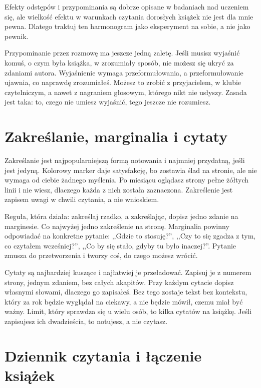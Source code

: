 Efekty odstępów i przypominania są dobrze opisane w badaniach nad uczeniem się, ale wielkość efektu w warunkach czytania dorosłych książek nie jest dla mnie pewna.  Dlatego traktuj ten harmonogram jako eksperyment na sobie, a nie jako pewnik.

Przypominanie przez rozmowę ma jeszcze jedną zaletę. Jeśli musisz wyjaśnić komuś, o czym była książka, w zrozumiały sposób, nie możesz się ukryć za zdaniami autora. Wyjaśnienie wymaga przeformułowania, a przeformułowanie ujawnia, co naprawdę zrozumiałeś. Możesz to zrobić z przyjacielem, w klubie czytelniczym, a nawet z nagraniem głosowym, którego nikt nie usłyszy. Zasada jest taka: to, czego nie umiesz wyjaśnić, tego jeszcze nie rozumiesz.

\section{Zakreślanie, marginalia i cytaty}

Zakreślanie jest najpopularniejszą formą notowania i najmniej przydatną, jeśli jest jedyną. Kolorowy marker daje satysfakcję, bo zostawia ślad na stronie, ale nie wymaga od ciebie żadnego myślenia. Po miesiącu oglądasz strony pełne żółtych linii i nie wiesz, dlaczego każda z nich została zaznaczona. Zakreślenie jest zapisem uwagi w chwili czytania, a nie wnioskiem.

Reguła, która działa: zakreślaj rzadko, a zakreślając, dopisz jedno zdanie na marginesie. Co najwyżej jedno zakreślenie na stronę. Marginalia powinny odpowiadać na konkretne pytanie: ,,Gdzie to stosuję?'', ,,Czy to się zgadza z tym, co czytałem wcześniej?'', ,,Co by się stało, gdyby tu było inaczej?''. Pytanie zmusza do przetworzenia i tworzy coś, do czego możesz wrócić.

Cytaty są najbardziej kuszące i najłatwiej je przeładować. Zapisuj je z numerem strony, jednym zdaniem, bez całych akapitów. Przy każdym cytacie dopisz własnymi słowami, dlaczego go zapisałeś. Bez tego zostaje tekst bez kontekstu, który za rok będzie wyglądał na ciekawy, a nie będzie mówił, czemu miał być ważny. Limit, który sprawdza się u wielu osób, to kilka cytatów na książkę. Jeśli zapisujesz ich dwadzieścia, to notujesz, a nie czytasz.

\section{Dziennik czytania i łączenie książek}

